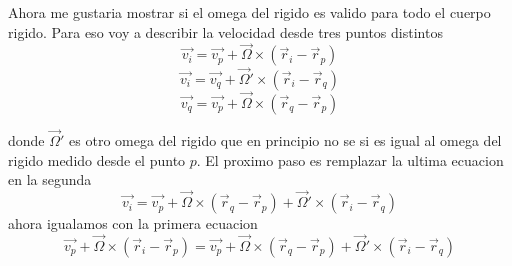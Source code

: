 \documentclass[../Main.tex]{subfiles}
\begin{document}
{    Ahora me gustaria mostrar si el omega del rigido es valido para todo el cuerpo
    rigido. Para eso voy a describir la velocidad desde tres puntos distintos
    \begin{equation*}
        \vec{v_i} = \vec{v_p} + \vec{\Omega} \times \left( \vec{r}_{i} - \vec{r}_{p} \right)
    \end{equation*}
    \begin{equation*}
        \vec{v_i} = \vec{v_q} + \vec{\Omega}' \times \left( \vec{r}_{i} - \vec{r}_{q} \right)
    \end{equation*}
    \begin{equation*}
        \vec{v_q} = \vec{v_p} + \vec{\Omega} \times \left( \vec{r}_{q} - \vec{r}_{p} \right)
    \end{equation*}

    donde $\vec{\Omega}'$ es otro omega del rigido que en principio no se si es
    igual al omega del rigido medido desde el punto $p$. El proximo paso es remplazar
    la ultima ecuacion en la segunda
    \begin{equation*}
        \vec{v_i} = \vec{v_p} + \vec{\Omega} \times \left( \vec{r}_{q} - \vec{r}_{p} \right) + \vec{\Omega}' \times \left( \vec{r}_{i} - \vec{r}_{q} \right)
    \end{equation*}
    ahora igualamos con la primera ecuacion
    \begin{equation*}
        \vec{v_p} + \vec{\Omega} \times \left( \vec{r}_{i} - \vec{r}_{p} \right) = \vec{v_p} + \vec{\Omega} \times \left( \vec{r}_{q} - \vec{r}_{p} \right) + \vec{\Omega}' \times \left( \vec{r}_{i} - \vec{r}_{q} \right)
    \end{equation*}

}
\end{document}
